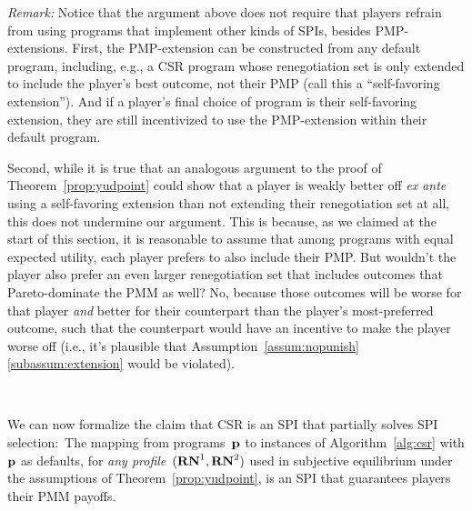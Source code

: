 \documentclass[sigconf]{aamas}
\theoremstyle{definition}
\begin{document}
\textit{Remark:} Notice that the argument above does not require that players refrain from using programs that implement other kinds of SPIs, besides PMP-extensions.
First, the PMP-extension can be constructed from any default program, including, e.g., a CSR program whose renegotiation set is only 
extended to include
the player’s best outcome,
not their PMP (call this a ``self-favoring extension'').
And if a player's final choice of program is their self-favoring extension, they are still incentivized to use the PMP-extension within their default program.

Second, while it is true that an analogous argument to the proof of Theorem~\ref{prop:yudpoint} could show that a player is weakly better off \textit{ex ante} using a self-favoring extension than
not extending their renegotiation set at all,
this does not undermine our argument.
This is because, as we claimed at the start of this section, it is reasonable to assume that among programs with equal expected utility, each player prefers to also include their PMP.
But wouldn't the player also prefer an even larger renegotiation set
that includes 
outcomes that Pareto-dominate the PMM as well?
No, because those outcomes will be worse for that player \textit{and}
better for their counterpart than the player’s most-preferred outcome,
such that the counterpart would have an incentive
to make the player worse off
(i.e., it's plausible
that Assumption~\ref{assum:nopunish}\ref{subassum:extension} would be violated).

\

We can now formalize the claim that
CSR
is an SPI
that partially solves
SPI selection:\ The mapping
from programs~$\textbf{p}$
to instances of 
Algorithm~\ref{alg:csr}
with$\textbf{p}$ as  
defaults,
for
\textit{any profile}~$(\mathbf{RN}^{1}, \mathbf{RN}^{2})$
used in subjective equilibrium
under the assumptions of
Theorem~\ref{prop:yudpoint},
is an SPI that guarantees players
their PMM payoffs.
\end{document}
